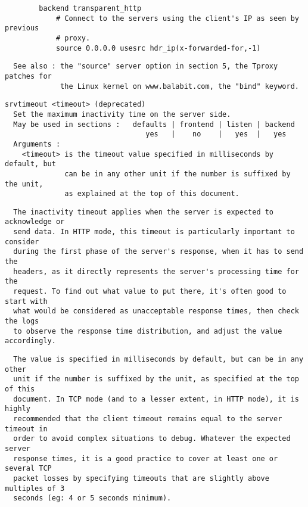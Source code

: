 \begin{verbatim}
        backend transparent_http
            # Connect to the servers using the client's IP as seen by previous
            # proxy.
            source 0.0.0.0 usesrc hdr_ip(x-forwarded-for,-1)
\end{verbatim}

\begin{verbatim}
  See also : the "source" server option in section 5, the Tproxy patches for
             the Linux kernel on www.balabit.com, the "bind" keyword.
\end{verbatim}

\begin{verbatim}
srvtimeout <timeout> (deprecated)
  Set the maximum inactivity time on the server side.
  May be used in sections :   defaults | frontend | listen | backend
                                 yes   |    no    |   yes  |   yes
  Arguments :
    <timeout> is the timeout value specified in milliseconds by default, but
              can be in any other unit if the number is suffixed by the unit,
              as explained at the top of this document.
\end{verbatim}

\begin{verbatim}
  The inactivity timeout applies when the server is expected to acknowledge or
  send data. In HTTP mode, this timeout is particularly important to consider
  during the first phase of the server's response, when it has to send the
  headers, as it directly represents the server's processing time for the
  request. To find out what value to put there, it's often good to start with
  what would be considered as unacceptable response times, then check the logs
  to observe the response time distribution, and adjust the value accordingly.
\end{verbatim}

\begin{verbatim}
  The value is specified in milliseconds by default, but can be in any other
  unit if the number is suffixed by the unit, as specified at the top of this
  document. In TCP mode (and to a lesser extent, in HTTP mode), it is highly
  recommended that the client timeout remains equal to the server timeout in
  order to avoid complex situations to debug. Whatever the expected server
  response times, it is a good practice to cover at least one or several TCP
  packet losses by specifying timeouts that are slightly above multiples of 3
  seconds (eg: 4 or 5 seconds minimum).
\end{verbatim}

